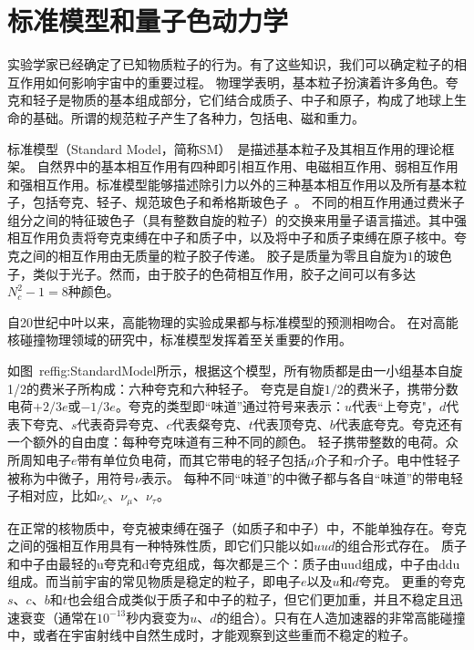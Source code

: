 
\section{标准模型和量子色动力学}
\label{sec:SM}
	实验学家已经确定了已知物质粒子的行为。有了这些知识，我们可以确定粒子的相互作用如何影响宇宙中的重要过程。
	物理学表明，基本粒子扮演着许多角色。夸克和轻子是物质的基本组成部分，它们结合成质子、中子和原子，构成了地球上生命的基础。所谓的规范粒子产生了各种力，包括电、磁和重力。
	
	标准模型（Standard Model，简称SM）~\parencite{D0:1995jca,Weinberg:1973un,quigg1985gauge}是描述基本粒子及其相互作用的理论框架。
	自然界中的基本相互作用有四种即引相互作用、电磁相互作用、弱相互作用和强相互作用。标准模型能够描述除引力以外的三种基本相互作用以及所有基本粒子，包括夸克、轻子、规范玻色子和希格斯玻色子~\parencite{weinberg2004making}。
	不同的相互作用通过费米子组分之间的特征玻色子（具有整数自旋的粒子）的交换来用量子语言描述。其中强相互作用负责将夸克束缚在中子和质子中，以及将中子和质子束缚在原子核中。夸克之间的相互作用由无质量的粒子胶子传递。
	胶子是质量为零且自旋为$1$的玻色子，类似于光子。然而，由于胶子的色荷相互作用，胶子之间可以有多达$N_c^2 - 1 = 8$种颜色。

	自20世纪中叶以来，高能物理的实验成果都与标准模型的预测相吻合。
	在对高能核碰撞物理领域的研究中，标准模型发挥着至关重要的作用。
	
	如图~ref{fig:StandardModel}所示，根据这个模型，所有物质都是由一小组基本自旋1/2的费米子所构成：六种夸克和六种轻子。
	夸克是自旋$1/2$的费米子，携带分数电荷$+2/3e$或$-1/3e$。夸克的类型即“味道”通过符号来表示：$u$代表“上夸克"，$d$代表下夸克、$s$代表奇异夸克、$c$代表粲夸克、$t$代表顶夸克、$b$代表底夸克。夸克还有一个额外的自由度：每种夸克味道有三种不同的颜色。
	轻子携带整数的电荷。众所周知电子$e$带有单位负电荷，而其它带电的轻子包括$\mu$介子和$\tau$介子。电中性轻子被称为中微子，用符号$\nu$表示。
	每种不同“味道”的中微子都与各自“味道”的带电轻子相对应，比如$\nu_e$、$\nu_\mu$、$\nu_\tau$。
	
	在正常的核物质中，夸克被束缚在强子（如质子和中子）中，不能单独存在。夸克之间的强相互作用具有一种特殊性质，即它们只能以如$uud$的组合形式存在。
	质子和中子由最轻的u夸克和d夸克组成，每次都是三个：质子由uud组成，中子由ddu组成。而当前宇宙的常见物质是稳定的粒子，即电子$e$以及$u$和$d$夸克。
	更重的夸克$s$、$c$、$b$和$t$也会组合成类似于质子和中子的粒子，但它们更加重，并且不稳定且迅速衰变（通常在$10^{-13}$秒内衰变为$u$、$d$的组合）。只有在人造加速器的非常高能碰撞中，或者在宇宙射线中自然生成时，才能观察到这些重而不稳定的粒子。
	
